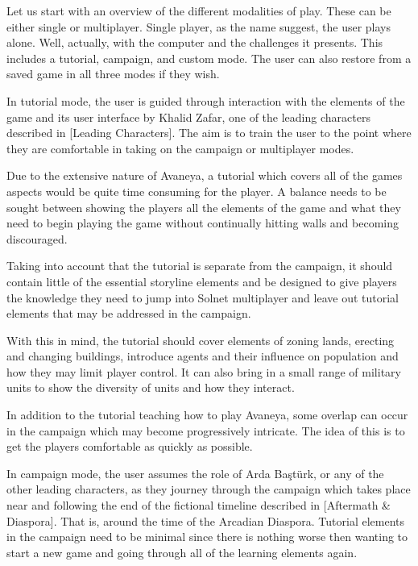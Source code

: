 
Let us start with an overview of the different modalities of play. These can be either single or multiplayer. Single player, as the name suggest, the user plays alone. Well, actually, with the computer and the challenges it presents. This includes a tutorial, campaign, and custom mode. The user can also restore from a saved game in all three modes if they wish.



In tutorial mode, the user is guided through interaction with the elements of the game and its user interface by Khalid Zafar, one of the leading characters described in [Leading Characters]. The aim is to train the user to the point where they are comfortable in taking on the campaign or multiplayer modes.

Due to the extensive nature of Avaneya, a tutorial which covers all of the games aspects would be quite time consuming for the player. A balance needs to be sought between showing the players all the elements of the game and what they need to begin playing the game without continually hitting walls and becoming discouraged.   

Taking into account that the tutorial is separate from the campaign, it should contain little of the essential storyline elements and be designed to give players the knowledge they need to jump into Solnet multiplayer and leave out tutorial elements that may be addressed in the campaign.  

With this in mind, the tutorial should cover elements of zoning lands, erecting and changing buildings, introduce agents and their influence on population and how they may limit player control. It can also bring in a small range of military units to show the diversity of units and how they interact. %

In addition to the tutorial teaching how to play Avaneya, some overlap can occur in the campaign which may become progressively intricate. The idea of this is to get the players comfortable as quickly as possible.



In campaign mode, the user assumes the role of Arda Baştürk, or any of the other leading characters, as they journey through the campaign which takes place near and following the end of the fictional timeline described in [Aftermath & Diaspora]. That is, around the time of the Arcadian Diaspora. Tutorial elements in the campaign need to be minimal since there is nothing worse then wanting to start a new game and going through all of the learning elements again.

